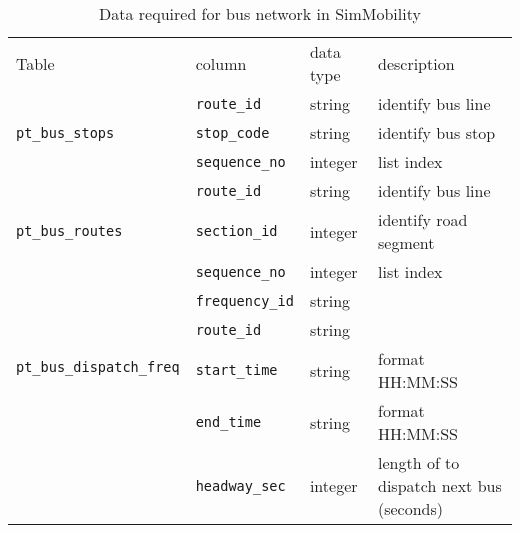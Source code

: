 \documentclass[11pt,twoside]{article}
\numberwithin{equation}{section}
\newcommand{\?}{\stackrel{?}{=}}
\begin{document}
\begin{table}[h!]
  \centering
  \begin{tabular}{l l l l}\toprule
    Table & column & data type & description \\
    \multirow{3}{*}{\texttt{pt\_bus\_stops}} & \texttt{route\_id} & string & identify bus line \\
          & \texttt{stop\_code} & string & identify bus stop \\
          & \texttt{sequence\_no} & integer & list index\\ \midrule
    \multirow{3}{*}{\texttt{pt\_bus\_routes}} & \texttt{route\_id} & string & identify bus line \\
          & \texttt{section\_id} & integer & identify road segment \\
          & \texttt{sequence\_no} & integer & list index\\ \midrule
    \multirow{4}{*}{\texttt{pt\_bus\_dispatch\_freq}} & \texttt{frequency\_id} & string & \\
          & \texttt{route\_id} & string & \\
          & \texttt{start\_time} & string & format HH:MM:SS \\
          & \texttt{end\_time} & string & format HH:MM:SS\\
          & \texttt{headway\_sec} & integer & length of to dispatch next bus (seconds) \\ \bottomrule
  \end{tabular}
  \caption{Data required for bus network in SimMobility}
  \label{tab:bus}
\end{table}

\printbibliography
\end{document}
